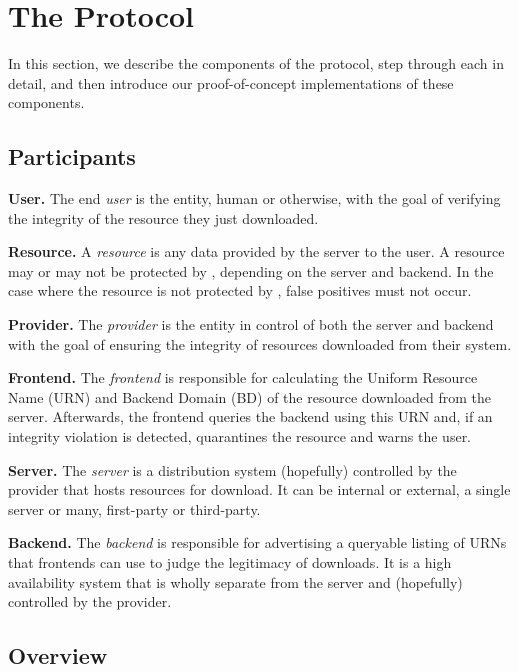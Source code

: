 \section{The \SYSTEM{} Protocol} \label{sec:approach}


In this section, we describe the components of the \SYSTEM{} protocol, step
through each in detail, and then introduce our proof-of-concept implementations
of these components.

\subsection{Participants}

\textbf{User.} The end \emph{user} is the entity, human or otherwise, with the
goal of verifying the integrity of the resource they just downloaded.

\textbf{Resource.} A \emph{resource} is any data provided by the server to the
user. A resource may or may not be protected by \SYSTEM{}, depending on the
server and backend. In the case where the resource is not protected by
\SYSTEM{}, false positives must not occur.

\textbf{Provider.} The \emph{provider} is the entity in control of both the
server and backend with the goal of ensuring the integrity of resources
downloaded from their system.

\textbf{\SYSTEM{} Frontend.} The \emph{frontend} is responsible for calculating
the Uniform Resource Name (URN) and Backend Domain (BD) of the resource
downloaded from the server. Afterwards, the frontend queries the backend using
this URN and, if an integrity violation is detected, quarantines the resource
and warns the user.

\textbf{Server.} The \emph{server} is a distribution system (hopefully)
controlled by the provider that hosts resources for download. It can be internal
or external, a single server or many, first-party or third-party.

\textbf{\SYSTEM{} Backend.} The \emph{backend} is responsible for advertising a
queryable listing of URNs that \SYSTEM{} frontends can use to judge the
legitimacy of downloads. It is a high availability system that is wholly
separate from the server and (hopefully) controlled by the provider.

\subsection{Overview}

